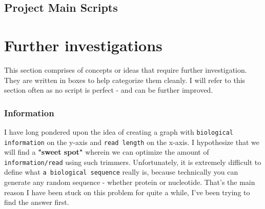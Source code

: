 \documentclass[11pt]{report}
\begin{document}
{\newpage

\pagestyle{fancy}
\fancyhf{}
\fancyhead[C]{\leftmark}  %
\fancyhead[R]{\thepage}




\chapter{Project Main Scripts}

\setcounter{section}{0}
\setcounter{subsection}{0}

\linenumbers*
\section{}
\setcounter{section}{1}
\setcounter{subsection}{0}


\newpage
\pagestyle{fancy}
\fancyhf{}
\fancyhead[C]{\leftmark}  %
\fancyhead[R]{\thepage}

\part{Further investigations}

\renewcommand{\thesection}{\arabic{section}}
\setcounter{section}{0}
\setcounter{subsection}{0}

This section comprises of concepts or ideas that require further investigation. They are written in boxes to help categorize them cleanly. I will refer to this section often as no script is perfect - and can be further improved. 

\section{Information}
\begin{tcolorbox}[colback=gray!10!white, coltitle=white, colframe=gray!80!black, title=Biological Information]
	\label{box:biological information}
	I have long pondered upon the idea of creating a graph with \texttt{biological information} on the y-axis and \texttt{read length} on the x-axis. I hypothesize that we will find a \textbf{"sweet spot" }wherein we can optimize the amount of \texttt{information/read} using such trimmers. Unfortunately, it is extremely difficult to define what \texttt{a biological sequence} really is, because technically you can generate any random sequence - whether protein or nucleotide. That's the main reason I have been stuck on this problem for quite a while, I've been trying to find the answer first.
	

\end{tcolorbox}}
\end{document}
